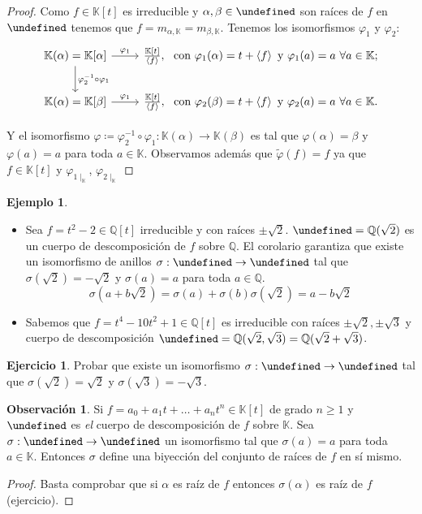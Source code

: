 \documentclass[10pt, spanish]{report}
\theoremstyle{definition}
\newtheorem*{ej}{Ejemplo}
\newtheorem*{ejer}{Ejercicio}
\newtheorem*{obs}{Observación}
\newcommand{\Q}{\mathbb{Q}}
\newcommand{\K}{\mathbb{K}}
\let\L\undefined
\newcommand{\L}{\mathbb{L}}
\renewcommand{\geq}{\geqslant}
\newcommand{\completar}{\fbox{\textbf{¡Completar!}}}
\begin{document}
\begin{proof}
    Como $f\in\K[t]$ es irreducible y $\alpha,\beta\in\L$ son raíces de $f$ en
    $\L$ tenemos que $f=m_{\alpha,\K}=m_{\beta,\K}$. Tenemos los isomorfismos
    $\varphi_1$ y $\varphi_2$:
    \[\begin{tikzcd}
        \K(\alpha)=\K[\alpha]\arrow{d}{\varphi_2^{-1}\circ\varphi_1}
        \arrow{r}{\varphi_1}&\frac{\K[t]}{\left<f\right>},\
        \text{ con }\varphi_1(\alpha)=t+\left<f\right>
        \text{ y }\varphi_1(a)=a\ \forall a\in\K;
        \\
        \K(\alpha)=\K[\beta] \arrow{r}{\varphi_1}&\frac{\K[t]}{\left<f\right>},\
        \text{ con }\varphi_2(\beta)=t+\left<f\right>
        \text{ y }\varphi_2(a)=a\ \forall a\in\K.
    \end{tikzcd}\]

    Y el isomorfismo $\varphi\coloneqq\varphi_2^{-1}\circ\varphi_1:\K(\alpha)\to
    \K(\beta)$ es tal que $\varphi(\alpha)=\beta$ y $\varphi(a)=a$ para toda
    $a\in\K$. Observamos además que $\tilde{\varphi}(f)=f$ ya que $f\in\K[t]$ y
    $\varphi_{1\mid_\K}$, $\varphi_{2\mid_\K}$

    \completar

\end{proof}

\begin{ej}
    \begin{itemize}
        \item Sea $f=t^2-2\in\Q[t]$ irreducible y con raíces $\pm\sqrt{2}$.
            $\L=\Q(\sqrt{2})$ es un cuerpo de descomposición de $f$ sobre $\Q$.
            El corolario garantiza que existe un isomorfismo de anillos $\sigma:
            \L\to\L$ tal que $\sigma(\sqrt{2})=-\sqrt{2}$ y $\sigma(a)=a$ para
            toda $a\in\Q$. \[\sigma(a+b\sqrt{2})=\sigma(a)+\sigma(b)
            \sigma(\sqrt{2})=a-b\sqrt{2}\]
        \item Sabemos que $f=t^4-10t^2+1\in\Q[t]$ es irreducible con raíces
            $\pm\sqrt{2},\pm\sqrt{3}$ y cuerpo de descomposición
            $\L=\Q(\sqrt{2}, \sqrt{3})=\Q(\sqrt{2}+\sqrt{3})$.
    \end{itemize}
\end{ej}

\begin{ejer}
    Probar que existe un isomorfismo $\sigma:\L\to\L$ tal que
    $\sigma(\sqrt{2})=\sqrt{2}$ y $\sigma(\sqrt{3})=-\sqrt{3}$.
\end{ejer}

\begin{obs}
    Si $f=a_0+a_1t+\ldots+a_nt^n\in\K[t]$ de grado $n\geq1$ y $\L$ es
    \textit{el} cuerpo de descomposición de $f$ sobre $\K$. Sea $\sigma:\L\to\L$
    un isomorfismo tal que $\sigma(a)=a$ para toda $a\in\K$. Entonces $\sigma$
    define una biyección del conjunto de raíces de $f$ en sí mismo.
\end{obs}
\begin{proof}
    Basta comprobar que si $\alpha$ es raíz de $f$ entonces $\sigma(\alpha)$ es
    raíz de $f$ (ejercicio).
\end{proof}
\end{document}
